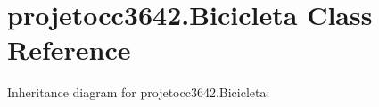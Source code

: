 \section{projetocc3642.\+Bicicleta Class Reference}
\label{classprojetocc3642_1_1_bicicleta}


Inheritance diagram for projetocc3642.\+Bicicleta\+:
